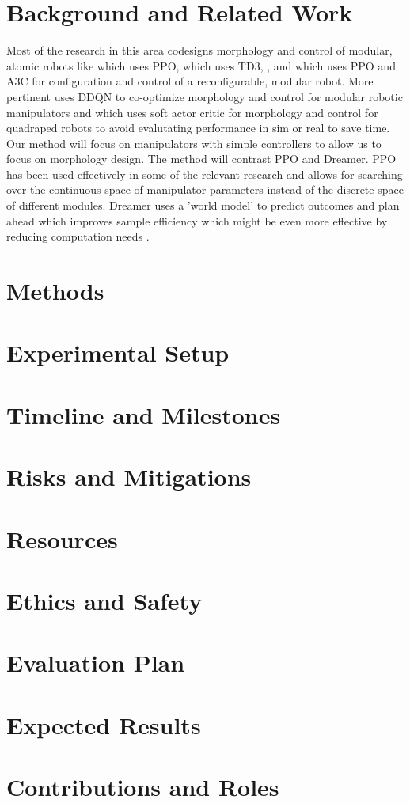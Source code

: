 \documentclass[conference]{IEEEtran}
\begin{document}
\section{Background and Related Work}
Most of the research in this area codesigns morphology and control of modular, atomic robots like \cite{bhatia2023reinforcement} which uses PPO, \cite{tjanaka2023co} which uses TD3, \cite{spielberg2025accelerated}, and \cite{kalimuthu2023} which uses PPO and A3C for configuration and control of a reconfigurable, modular robot.
More pertinent \cite{ding2024modular} uses DDQN to co-optimize morphology and control for modular robotic manipulators and \cite{luck2019data} which uses soft actor critic for morphology and control for quadraped robots to avoid evalutating performance in sim or real to save time.
Our method will focus on manipulators with simple controllers to allow us to focus on morphology design.
The method will contrast PPO and Dreamer.
PPO has been used effectively in some of the relevant research and allows for searching over the continuous space of manipulator parameters instead of the discrete space of different modules.
Dreamer uses a 'world model' to predict outcomes and plan ahead which improves sample efficiency which might be even more effective by reducing computation needs \cite{hafner2019dream}.

\section{Methods}

\section{Experimental Setup}

\section{Timeline and Milestones}

\section{Risks and Mitigations}

\section{Resources}

\section{Ethics and Safety}

\section{Evaluation Plan}

\section{Expected Results}

\section{Contributions and Roles}


\end{document}
